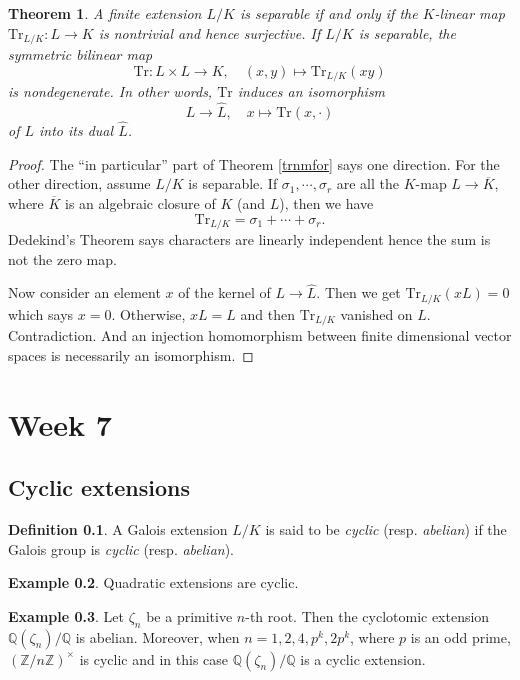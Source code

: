 \documentclass[12pt]{report}
\newtheorem{theorem}{Theorem}[section]
\theoremstyle{definition}
\newtheorem{definition}[theorem]{Definition}
\newtheorem{example}[theorem]{Example}
\newcommand{\ok}{\overline{K}}
\newcommand{\ZZ}{\mathbb{Z}}
\newcommand{\QQ}{\mathbb{Q}}
\newcommand{\Tr}{\text{Tr}}
\begin{document}
\begin{theorem}
	A finite extension $L/K$ is separable if and only if the $K$-linear map $\Tr_{L/K}: L\to K$ is nontrivial and hence surjective. If $L/K$ is separable, the symmetric bilinear map $$\Tr:L\times L\to K,\quad (x,y)\mapsto \Tr_{L/K}(xy)$$ is nondegenerate. In other words, $\Tr$ induces an isomorphism $$L\to \hat{L}, \quad x\mapsto \Tr(x,\cdot)$$ of $L$ into its dual $\hat{L}$.
\end{theorem}

\begin{proof}
	The ``in particular'' part of Theorem \ref{trnmfor} says one direction. For the other direction, assume $L/K$ is separable. If $\sigma_1,\cdots,\sigma_r$ are all the $K$-map $L\to\overline{K}$, where $\ok$ is an algebraic closure of $K$ (and $L$), then we have $$\Tr_{L/K}=\sigma_1+\cdots+\sigma_r.$$ Dedekind's Theorem says characters are linearly independent hence the sum is not the zero map.


	Now consider an element $x$ of the kernel of $L\to \hat{L}$. Then we get $\Tr_{L/K}(xL)=0$ which says $x=0$. Otherwise, $xL=L$ and then $\Tr_{L/K}$ vanished on $L$. Contradiction. And an injection homomorphism between finite dimensional vector spaces is necessarily an isomorphism.
\end{proof}

\chapter*{Week 7}
\setcounter{chapter}{7}

\section{Cyclic extensions}

\begin{definition}
	A Galois extension $L/K$ is said to be \emph{cyclic} (resp. \emph{abelian}) if the Galois group is \emph{cyclic} (resp. \emph{abelian}).
\end{definition}

\begin{example}
	Quadratic extensions are cyclic.
\end{example}

\begin{example}
	Let $\zeta_n$ be a primitive $n$-th root. Then the cyclotomic extension $\QQ(\zeta_n)/\QQ$ is abelian. Moreover, when $n=1,2,4,p^k,2p^k$, where $p$ is an odd prime, $(\ZZ/n\ZZ)^\times$ is cyclic and in this case $\QQ(\zeta_n)/\QQ$ is a cyclic extension.
\end{example}
\end{document}
